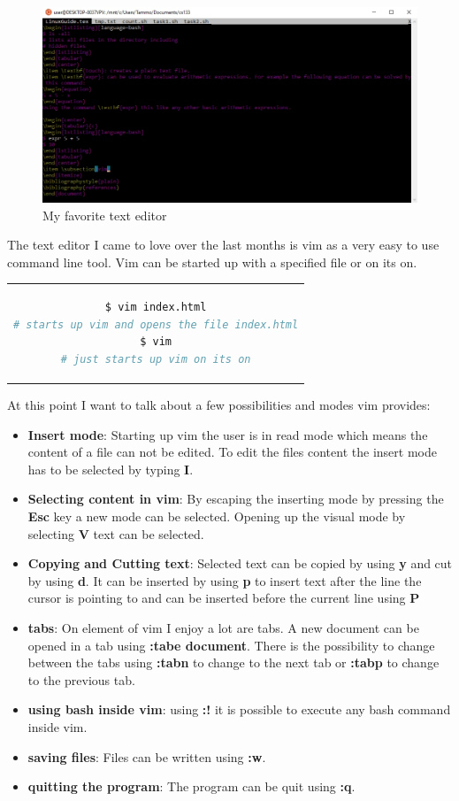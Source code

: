 \documentclass[12pt,a4paper]{article}
\begin{document}
\begin{figure}[H]
\begin{center}
\includegraphics[width=\textwidth]{./vim.jpg}
\caption{My favorite text editor}
\label{vim}
\end{center}
\end{figure}
The text editor I came to love over the last months is vim as a very easy to use command line tool.
Vim can be started up with a specified file or on its on.

\begin{center}
\begin{tabular}{c}
\begin{lstlisting}[language=bash]
$ vim index.html
# starts up vim and opens the file index.html
$ vim
# just starts up vim on its on
\end{lstlisting}
\end{tabular}
\end{center}
At this point I want to talk about a few possibilities and modes vim provides:
\begin{itemize}
\item \textbf{Insert mode}: Starting up vim the user is in read mode which means the content of a file
can not be edited. To edit the files content the insert mode has to be selected by typing \textbf{I}.
\item \textbf{Selecting content in vim}: By escaping the inserting mode by pressing the \textbf{Esc} key
a new mode can be selected. Opening up the visual mode by selecting \textbf{V} text can be selected.
\item \textbf{Copying and Cutting text}: Selected text can  be copied by using \textbf{y} and cut by using \textbf{d}. 
It can be inserted by using \textbf{p} to insert text after the line the cursor is pointing to and can be
inserted before the current line using \textbf{P}
\item \textbf{tabs}: On element of vim I enjoy a lot are tabs. A new document can be opened in a tab using
\textbf{:tabe document}. There is the possibility to change between the tabs using \textbf{:tabn} to change to the
next tab or \textbf{:tabp} to change to the previous tab.
\item \textbf{using bash inside vim}: using \textbf{:!} it is possible to execute any bash command inside vim.
\item \textbf{saving files}: Files can be written using \textbf{:w}. 
\item \textbf{quitting the program}: The program can be quit using \textbf{:q}.
\end{itemize}


\end{document}
